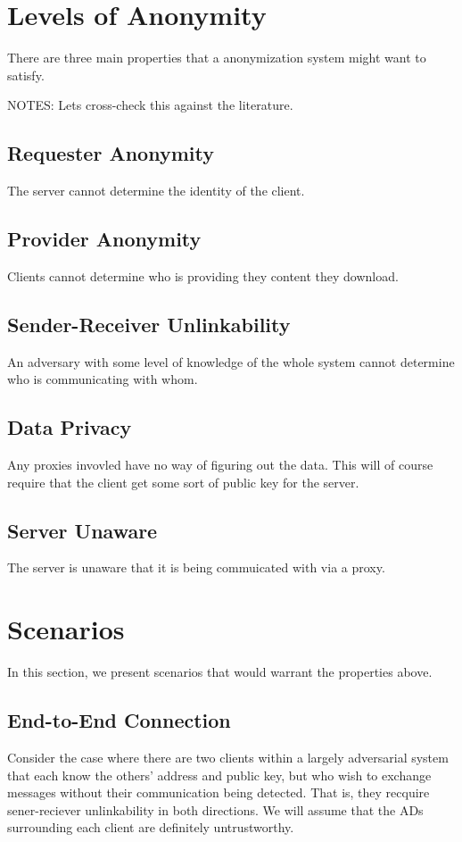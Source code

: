 \documentclass{article}
\begin{document}
\section{Levels of Anonymity}
There are three main properties that a anonymization system might want to satisfy.

NOTES: Lets cross-check this against the literature.
\subsection{Requester Anonymity}
The server cannot determine the identity of the client.
\subsection{Provider Anonymity}
Clients cannot determine who is providing they content they download.
\subsection{Sender-Receiver Unlinkability}
An adversary with some level of knowledge of the whole system cannot determine who is communicating with whom.
\subsection{Data Privacy}
Any proxies invovled have no way of figuring out the data.  This will of course require that the client get some sort of public key for the server.
\subsection{Server Unaware}
The server is unaware that it is being commuicated with via a proxy.
\section{Scenarios}
In this section, we present scenarios that would warrant the properties above.
\subsection{End-to-End Connection}
Consider the case where there are two clients within a largely adversarial system that each know the others' address and public key, but who wish to exchange messages without their communication being detected.  That is, they recquire sener-reciever unlinkability in both directions.  We will assume that the ADs surrounding each client are definitely untrustworthy.
\end{document}
